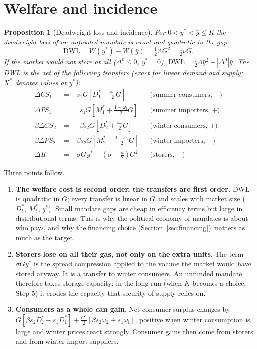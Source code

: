 \documentclass[11pt]{article}
\newtheorem{proposition}{Proposition}
\theoremstyle{definition}
\newcommand{\ybar}{\bar y}
\newcommand{\Dz}{\Delta^{0}}
\begin{document}
\section{Welfare and incidence}\label{sec:welfare}

\begin{proposition}[Deadweight loss and incidence]\label{prop:dwl}
For $0<y^*<\ybar\le K$ the deadweight loss of an unfunded mandate is exact and quadratic in the gap:
\begin{equation}
\text{DWL} = W(y^*)-W(\ybar)=\tfrac{1}{2}\Lambda G^{2}=\tfrac{1}{2}\nu G .
\end{equation}
If the market would not store at all ($\Dz\le 0$, $y^*=0$), $\text{DWL}=\frac12\Lambda\ybar^2+|\Dz|\ybar$.
The DWL is the net of the following transfers (exact for linear demand and supply; $X^*$ denotes values at $y^*$):
\begin{align}
\Delta CS_1 &= -s_1G\left[D_1^*-\tfrac{\omega_1}{2}G\right] &&\text{(summer consumers, $-$)}\\
\Delta PS_1 &= \phantom{-}s_1G\left[M_1^*+\tfrac{1-\omega_1}{2}G\right] &&\text{(summer importers, $+$)}\\
\beta\Delta CS_2 &= \phantom{-}\beta s_2G\left[D_2^*+\tfrac{\omega_2}{2}G\right] &&\text{(winter consumers, $+$)}\\
\beta\Delta PS_2 &= -\beta s_2G\left[M_2^*-\tfrac{1-\omega_2}{2}G\right] &&\text{(winter importers, $-$)}\\
\Delta \Pi &= -\sigma G\,y^* - \left(\sigma+\tfrac{\kappa}{2}\right)G^{2} &&\text{(storers, $-$)}
\end{align}
\end{proposition}

Three points follow.
\begin{enumerate}
\item \textbf{The welfare cost is second order; the transfers are first order.} DWL is quadratic in $G$;
every transfer is linear in $G$ and scales with market size ($D^*_t$, $M^*_t$, $y^*$). Small mandate gaps
are cheap in efficiency terms but large in distributional terms. This is why the political economy of
mandates is about who pays, and why the financing choice (Section~\ref{sec:financing}) matters as much as
the target.
\item \textbf{Storers lose on all their gas, not only on the extra units.} The term $\sigma G y^*$ is the
spread compression applied to the volume the market would have stored anyway. It is a transfer to winter
consumers. An unfunded mandate therefore taxes storage capacity; in the long run (when $K$ becomes a
choice, Step 5) it erodes the capacity that security of supply relies on.
\item \textbf{Consumers as a whole can gain.} Net consumer surplus changes by
$G\left[\beta s_2D_2^*-s_1D_1^*\right]+\frac{G^2}{2}\left[\beta s_2\omega_2+s_1\omega_1\right]$, positive when
winter consumption is large and winter prices react strongly. Consumer gains then come from storers and
from winter import suppliers.
\end{enumerate}
\end{document}
